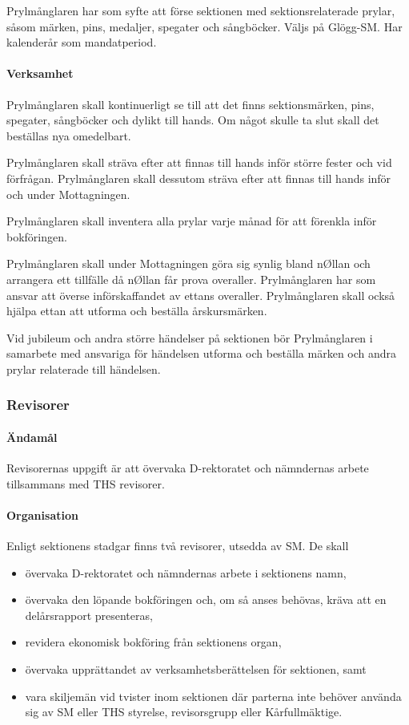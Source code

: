 \documentclass{dgovdoc}
\begin{document}
Prylmånglaren har som syfte att förse sektionen med sektionsrelaterade prylar, såsom märken, pins, medaljer, spegater och sångböcker. Väljs på Glögg-SM. Har kalenderår som mandatperiod.

\paragraph{Verksamhet}

Prylmånglaren skall kontinuerligt se till att det finns sektionsmärken, pins, spegater, sångböcker och dylikt till hands. Om något skulle ta slut skall det beställas nya omedelbart.

Prylmånglaren skall sträva efter att finnas till hands inför större fester och vid förfrågan. Prylmånglaren skall dessutom sträva efter att finnas till hands inför och under Mottagningen.

Prylmånglaren skall inventera alla prylar varje månad för att förenkla inför bokföringen.

Prylmånglaren skall under Mottagningen göra sig synlig bland nØllan och arrangera ett tillfälle då nØllan får prova overaller. Prylmånglaren har som ansvar att överse införskaffandet av ettans overaller. Prylmånglaren skall också hjälpa ettan att utforma och beställa årskursmärken.

Vid jubileum och andra större händelser på sektionen bör Prylmånglaren i samarbete med ansvariga för händelsen utforma och beställa märken och andra prylar relaterade till händelsen.

\subsubsection{Revisorer}

\paragraph{Ändamål}

Revisorernas uppgift är att övervaka D-rektoratet och nämndernas arbete tillsammans med THS revisorer.

\paragraph{Organisation}

Enligt sektionens stadgar finns två revisorer, utsedda av SM. De skall

\begin{itemize}
  \item övervaka D-rektoratet och nämndernas arbete i sektionens namn,
  \item övervaka den löpande bokföringen och, om så anses behövas, kräva att en delårsrapport presenteras,
  \item revidera ekonomisk bokföring från sektionens organ,
  \item övervaka upprättandet av verksamhetsberättelsen för sektionen, samt
  \item vara skiljemän vid tvister inom sektionen där parterna inte behöver använda sig av SM eller THS styrelse, revisorsgrupp eller Kårfullmäktige.
\end{itemize}
\end{document}
